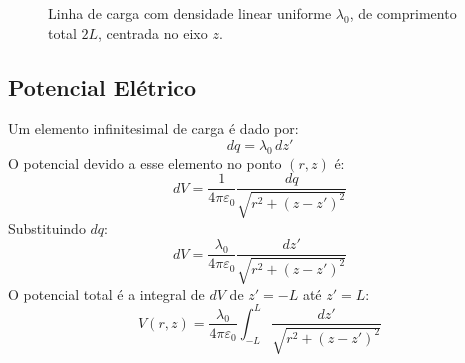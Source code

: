 \documentclass[a4paper,12pt]{article}
\begin{document}
\begin{figure}[h!]
\begin{center}
\end{center}
\caption{Linha de carga com densidade linear uniforme \( \lambda_0 \), de comprimento total \( 2L \), 
centrada no eixo \( z \).}
\end{figure}

\subsection*{Potencial Elétrico}

Um elemento infinitesimal de carga é dado por:
\begin{equation}
dq = \lambda_0 \, dz'
\end{equation}
O potencial devido a esse elemento no ponto \( (r, z) \) é:
\begin{equation}
dV = \frac{1}{4\pi\varepsilon_0} \frac{dq}{\sqrt{r^2 + (z - z')^2}}
\end{equation}
Substituindo \( dq \):
\begin{equation}
dV = \frac{\lambda_0}{4\pi\varepsilon_0} \frac{dz'}{\sqrt{r^2 + (z - z')^2}}
\end{equation}
O potencial total é a integral de \( dV \) de \( z' = -L \) até \( z' = L \):
\begin{equation}
V(r,z) = \frac{\lambda_0}{4\pi\varepsilon_0} \int_{-L}^{L} \frac{dz'}{\sqrt{r^2 + (z - z')^2}}
\end{equation}
\end{document}
